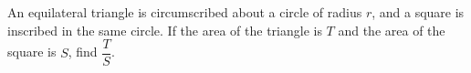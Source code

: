An equilateral triangle is circumscribed about a circle of radius $r$, and a square is inscribed in the same circle. If the area of the triangle is $T$ and the area of the square is $S$, find $\dfrac {T}{S}$.

